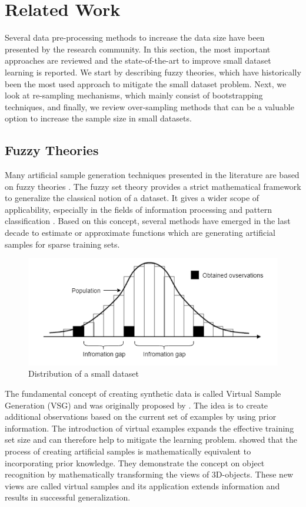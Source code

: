 \documentclass[parskip=full]{scrartcl}
\begin{document}
\section{Related Work}

Several data pre-processing methods to increase the data size have been
presented by the research community. In this section, the most important
approaches are reviewed and the state-of-the-art to improve small dataset
learning is reported. We start by describing fuzzy theories, which have
historically been the most used approach to mitigate the small dataset problem.
Next, we look at re-sampling mechanisms, which mainly consist of bootstrapping
techniques, and finally, we review over-sampling methods that can be a valuable
option to increase the sample size in small datasets.

\subsection{Fuzzy Theories}

Many artificial sample generation techniques presented in the literature are
based on fuzzy theories \cite{AbdulLateh.2017}. The fuzzy set theory provides a
strict mathematical framework to generalize the classical notion of a dataset.
It gives a wider scope of applicability, especially in the fields of information
processing and pattern classification \cite{Zimmermann.2010}. Based on this
concept, several methods have emerged in the last decade to estimate or
approximate functions which are generating artificial samples for sparse
training sets.

\begin{figure}[H]
	\centering
	\includegraphics[width=0.6\linewidth]{"../analysis/small_data_distribution"}
	\caption{Distribution of a small dataset \cite{Tsai.2015}}
	\label{fig:small-data-distribution}
\end{figure}

The fundamental concept of creating synthetic data is called Virtual Sample
Generation (VSG) and was originally proposed by \cite{Niyogi.1998}. The idea is
to create additional observations based on the current set of examples by using
prior information. The introduction of virtual examples expands the effective
training set size and can therefore help to mitigate the learning problem.
\cite{Niyogi.1998} showed that the process of creating artificial samples is
mathematically equivalent to incorporating prior knowledge. They demonstrate the
concept on object recognition by mathematically transforming the views of
3D-objects. These new views are called virtual samples and its application
extends information and results in successful generalization.
\end{document}
